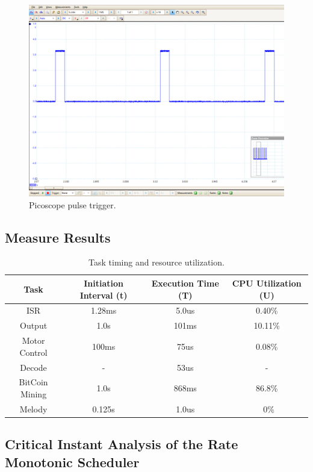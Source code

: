 \documentclass{article}
\begin{document}
\begin{figure}[H]
\begin{center}
   \includegraphics[width=0.6\linewidth]{ScopeOutput.png}
\end{center}
   \caption{Picoscope pulse trigger.}
\label{fig:long}
\label{fig:onecol}
\end{figure}


\subsection{Measure Results}

\begin{table}[ht]
\centering                      %
\begin{tabular}{c c c c}        %
Task & Initiation Interval (t) & Execution Time (T) & CPU Utilization (U) \\ [0.5ex]   %
\hline                          %
ISR & 1.28ms & 5.0us & 0.40\% \\           %
Output & 1.0s & 101ms & 10.11\% \\
Motor Control & 100ms & 75us  & 0.08\% \\
Decode & - & 53us & - \\
BitCoin Mining & 1.0s & 868ms & 86.8\% \\
Melody & 0.125s & 1.0us & ~0\% \\[1ex]     %
\end{tabular}
\caption{Task timing and resource utilization.}
\label{table:nonlin}            %
\end{table}


\subsection{Critical Instant Analysis of the Rate Monotonic Scheduler}
\end{document}
